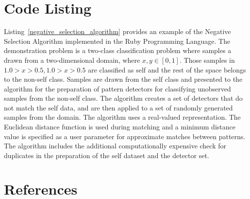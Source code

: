 \documentclass[a4paper, 11pt]{article}
\begin{document}
\section{Code Listing}
\label{sec:code}
Listing~\ref{negative_selection_algorithm} provides an example of the Negative Selection Algorithm implemented in the Ruby Programming Language.
The demonstration problem is a two-class classification problem where samples a drawn from a two-dimensional domain, where $x,y \in [0,1]$. Those samples in $1.0>x>0.5, 1.0>x>0.5$ are classified as self and the rest of the space belongs to the non-self class. Samples are drawn from the self class and presented to the algorithm for the preparation of pattern detectors for classifying unobserved samples from the non-self class.
The algorithm creates a set of detectors that do not match the self data, and are then applied to a set of randomly generated samples from the domain. The algorithm uses a real-valued representation. The Euclidean distance function is used during matching and a minimum distance value is specified as a user parameter for approximate matches between patterns. The algorithm includes the additional computationally expensive check for duplicates in the preparation of the self dataset and the detector set.




\section{References}
\label{sec:references}

% 
% 
\end{document}
